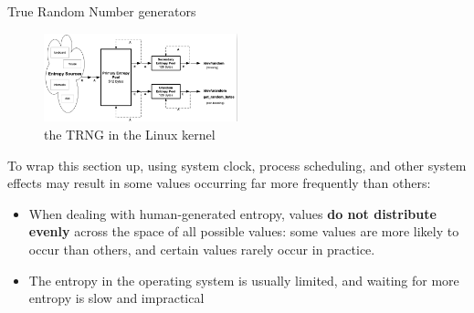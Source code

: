 \begin{section}{True Random Number generators}
\begin{figure}
    \centering
    \includegraphics[width=0.5\textwidth]{img/hardware/linux rng.png}
    \caption{the TRNG in the Linux kernel}
  \end{figure}
  To wrap this section up, using system clock, process scheduling, and other system effects may 
  result in some values occurring far more frequently than others:
  \begin{itemize}
    \item When dealing with human-generated entropy, values \textbf{do not distribute evenly} across
      the space of all possible values: some values are more likely to occur than others, and
      certain values rarely occur in practice.
    \item The entropy in the operating system is usually limited, and waiting for more entropy is
      slow and impractical
  \end{itemize}
\end{section}
